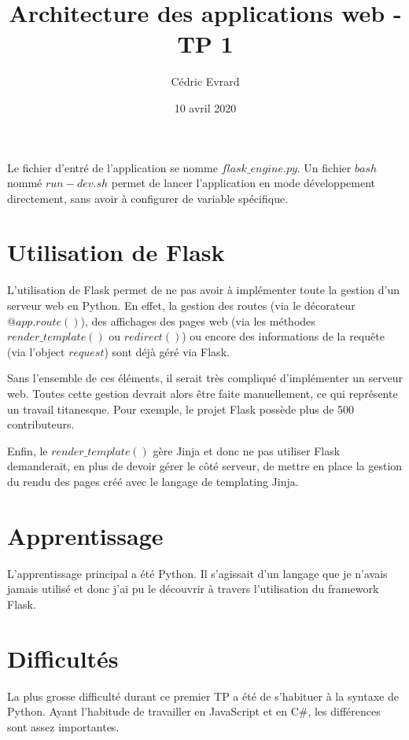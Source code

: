 \documentclass{article}
\title{Architecture des applications web - TP 1}
\author{Cédric Evrard}
\date{10 avril 2020}
\begin{document}
\maketitle

Le fichier d'entré de l'application se nomme $flask\_engine.py$. Un fichier $bash$ nommé $run-dev.sh$ permet de lancer l'application en mode développement directement, sans avoir à configurer de variable spécifique. 

\section{Utilisation de Flask}
L'utilisation de Flask permet de ne pas avoir à implémenter toute la gestion d'un serveur web en Python. En effet, la gestion des routes (via le décorateur $@app.route()$), des affichages des pages web (via les méthodes $render\_template()$ ou $redirect()$) ou encore des informations de la requête (via l'object $request$) sont déjà géré via Flask.

Sans l'ensemble de ces éléments, il serait très compliqué d'implémenter un serveur web. Toutes cette gestion devrait alors  être faite manuellement, ce qui représente un travail titanesque. Pour exemple, le projet Flask possède plus de 500 contributeurs.

Enfin, le $render\_template()$ gère Jinja et donc ne pas utiliser Flask demanderait, en plus de devoir gérer le côté serveur, de mettre en place la gestion du rendu des pages créé avec le langage de templating Jinja.

\section{Apprentissage}

L'apprentissage principal a été Python. Il s'agissait d'un langage que je n'avais jamais utilisé et donc j'ai pu le découvrir à travers l'utilisation du framework Flask.  

\section{Difficultés}

La plus grosse difficulté durant ce premier TP a été de s'habituer à la syntaxe de Python. Ayant l'habitude de travailler en JavaScript et en C\#, les différences sont assez importantes.
\end{document}

